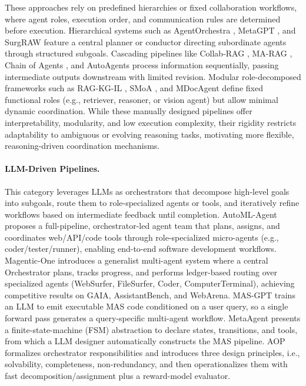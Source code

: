 These approaches rely on predefined hierarchies or fixed collaboration workflows, where agent roles, execution order, and communication rules are determined before execution. Hierarchical systems such as AgentOrchestra \cite{agentorchestra}, MetaGPT \cite{hong2024metagpt}, and SurgRAW \cite{low2025surgraw} feature a central planner or conductor directing subordinate agents through structured subgoals. Cascading pipelines like Collab-RAG \cite{xu2025collab}, MA-RAG \cite{marag}, Chain of Agents \cite{zhang2024chain}, and AutoAgents \cite{chen2023autoagents} process information sequentially, passing intermediate outputs downstream with limited revision. Modular role-decomposed frameworks such as RAG-KG-IL \cite{ragkgil}, SMoA \cite{smoa}, and MDocAgent \cite{han2025mdocagentmultimodalmultiagentframework} define fixed functional roles (e.g., retriever, reasoner, or vision agent) but allow minimal dynamic coordination. While these manually designed pipelines offer interpretability, modularity, and low execution complexity, their rigidity restricts adaptability to ambiguous or evolving reasoning tasks, motivating more flexible, reasoning-driven coordination mechanisms.





\paragraph{LLM-Driven Pipelines.}

This category leverages LLMs as orchestrators that decompose high-level goals into subgoals, route them to role-specialized agents or tools, and iteratively refine workflows based on intermediate feedback until completion. AutoML-Agent \cite{trirat2024automl} proposes a full-pipeline, orchestrator-led agent team that plans, assigns, and coordinates web/API/code tools through role-specialized micro-agents (e.g., coder/tester/runner), enabling end-to-end software development workflows. Magentic-One \cite{fourney2024magentic} introduces a generalist multi-agent system where a central Orchestrator plans, tracks progress, and performs ledger-based routing over specialized agents (WebSurfer, FileSurfer, Coder, ComputerTerminal), achieving competitive results on GAIA, AssistantBench, and WebArena. MAS-GPT \cite{ye2025mas} trains an LLM to emit executable MAS code conditioned on a user query, so a single forward pass generates a query-specific multi-agent workflow. MetaAgent \cite{zhang2025metaagent} presents a finite-state-machine (FSM) abstraction to declare states, transitions, and tools, from which a LLM designer automatically constructs the MAS pipeline. AOP \cite{li2024agent} formalizes orchestrator responsibilities and introduces three design principles, i.e., solvability, completeness, non-redundancy, and then operationalizes them with fast decomposition/assignment plus a reward-model evaluator.

